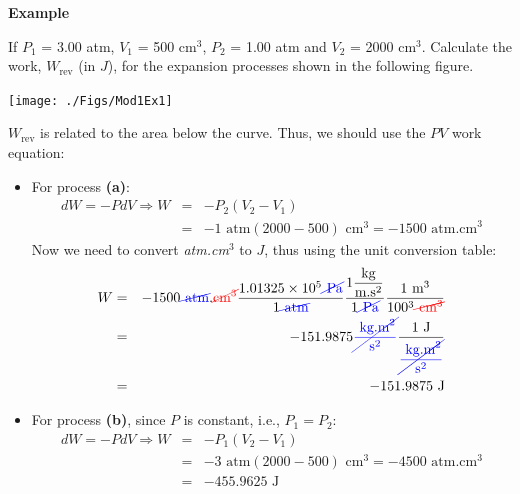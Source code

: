    \begin{MyExample}{\begin{center}{\bf Example}\end{center}}
     \begin{example}\label{Chapter:FirstLaw:Example2}
       If $P_{1}$ = 3.00 atm, $V_{1}$ = 500 cm$^{3}$, $P_{2}$ = 1.00 atm and $V_{2}$ = 2000 cm$^{3}$. Calculate the work, $W_{\text{rev}}$ (in $J$), for the expansion processes shown in the following figure.
         \begin{center}
           \texttt{[image: ./Figs/Mod1Ex1]}
         \end{center}
     \end{example}
     
        $W_{\text{rev}}$ is related to the area below the curve. Thus, we should use the $PV$ work equation:
           \begin{itemize}
              \item For process {\bf (a)}: 
                 \begin{eqnarray}
                    d W = -PdV \Longrightarrow W &=& -P_{2}\left(V_{2}-V_{1}\right) \nonumber \\
                                                 &=& - 1\text{ atm}\left(2000-500\right)\text{ cm}^{3} = -1500\text{ atm.cm}^{3} \nonumber 
                 \end{eqnarray}
                 Now we need to convert {\it atm.cm}$^{3}$ to $J$, thus using the unit conversion table:
                 \begin{eqnarray}
                     W &=& -1500\textcolor{blue}{\cancel{\text{ atm}}}.\textcolor{red}{\cancel{\text{cm}^{3}}} \displaystyle\frac{1.01325\times 10^{5}\textcolor{blue}{\cancel{\text{ Pa}}}}{1\textcolor{blue}{\cancel{\text{ atm}}}} \displaystyle\frac{1 \displaystyle\frac{\text{kg}}{\text{m.s}^{2}}}{1\textcolor{blue}{\cancel{\text{ Pa}}}} \displaystyle\frac{1\text{ m}^{3}}{ 100^{3} \textcolor{red}{\cancel{\text{ cm}^{3}}}} \nonumber \\
                       &=& -151.9875 \textcolor{blue}{\cancel{\displaystyle\frac{\text{ kg.m}^{2}}{\text{s}^{2}}}} \displaystyle\frac{ 1 \text{ J}}{ \textcolor{blue}{\cancel{\displaystyle\frac{\text{ kg.m}^{2}}{\text{s}^{2}}}}} \nonumber\\
                       &=& -151.9875\text{ J} \nonumber
                 \end{eqnarray}
%
              \item For process {\bf (b)}, since $P$ is constant, i.e., $P_{1}=P_{2}$:
                 \begin{eqnarray}
                    d W = -PdV \Longrightarrow W &=& -P_{1}\left(V_{2}-V_{1}\right) \nonumber \\
                                                 &=& - 3\text{ atm}\left(2000-500\right)\text{ cm}^{3} = -4500\text{ atm.cm}^{3} \nonumber \\
                                                 &=& -455.9625\text{ J} \nonumber
                 \end{eqnarray}
           \end{itemize}
   \end{MyExample}

